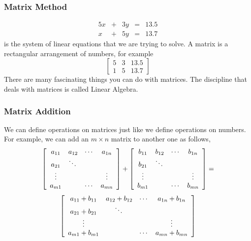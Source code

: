 \documentclass[xcolor=dvipsnames]{beamer}
\begin{document}
\begin{frame}
  \frametitle{Matrix Method}
  \begin{equation}
    \label{eq:ohghohfi}
    \begin{array}{rcrcl}
      5x&+&3y&=&13.5 \\
      x&+&5y&=&13.7
    \end{array}
  \end{equation}
is the system of linear equations that we are trying to solve. A
matrix is a rectangular arrangement of numbers, for example
\begin{equation}
  \label{eq:cegeemoi}
  \left[\begin{array}{ccc}
    5&3&13.5 \\
    1&5&13.7
  \end{array}\right]
\end{equation}
There are many fascinating things you can do with matrices. The
discipline that deals with matrices is called Linear Algebra. 
\end{frame}

\begin{frame}
  \frametitle{Matrix Addition}
We can define operations on matrices just like we define operations on
numbers. For example, we can add an $m\times{}n$ matrix to another one
as follows,
\begin{equation}
  \label{eq:ahloongi}
  \left[\begin{array}{cccc}
    a_{11}&a_{12}&\cdots{}&a_{1n} \\
          a_{21}&\ddots{}&& \\
          \vdots{}&&&\vdots \\
          a_{m1}&&\cdots{}&a_{mn}
  \end{array}\right]+\left[
\begin{array}{cccc}
    b_{11}&b_{12}&\cdots{}&b_{1n} \\
          b_{21}&\ddots{}&& \\
          \vdots{}&&&\vdots \\
          b_{m1}&&\cdots{}&b_{mn}
  \end{array}\right]=\notag
\end{equation}
\begin{equation}
  \label{eq:fohghoaw}
\left[
\begin{array}{cccc}
    a_{11}+b_{11}&a_{12}+b_{12}&\cdots{}&a_{1n}+b_{1n} \\
          a_{21}+b_{21}&\ddots{}&& \\
          \vdots{}&&&\vdots \\
          a_{m1}+b_{m1}&&\cdots{}&a_{mn}+b_{mn}
  \end{array}\right]\notag
\end{equation}
\end{frame}
\end{document}
